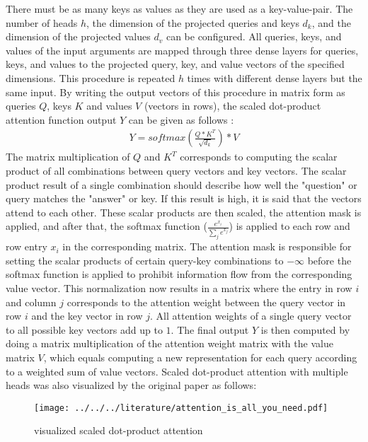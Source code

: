 \documentclass[draft,final]{vutinfth} %
\begin{document}
    There must be as many keys as values as they are used as a key-value-pair.
    The number of heads $h$, the dimension of the projected queries and keys $d_k$, and the dimension of the projected values $d_v$ can be configured.
    All queries, keys, and values of the input arguments are mapped through three dense layers for queries, keys, and values to the projected query, key, and value vectors of the specified dimensions.
    This procedure is repeated $h$ times with different dense layers but the same input. 
    By writing the output vectors of this procedure in matrix form as queries $Q$, keys $K$ and values $V$ (vectors in rows), the scaled dot-product attention function output $Y$ can be given as follows \cite[p. 4]{Transformer}:
    \begin{align}
    \label{sdpa}
    Y = softmax \left( \frac{Q * K^T}{\sqrt{d_k}} \right) * V
    \end{align}
    The matrix multiplication of $Q$ and $K^T$ corresponds to computing the scalar product of all combinations between query vectors and key vectors.
    The scalar product result of a single combination should describe how well the "question" or query matches the "answer" or key.
    If this result is high, it is said that the vectors attend to each other.
    These scalar products are then scaled, the attention mask is applied, and after that, the softmax function ($\frac{e^{x_i}}{\sum_j{e^{x_j}}}$) is applied to each row and row entry $x_i$ in the corresponding matrix.
    The attention mask is responsible for setting the scalar products of certain query-key combinations to $-\infty$ before the softmax function is applied to prohibit information flow from the corresponding value vector.
    This normalization now results in a matrix where the entry in row $i$ and column $j$ corresponds to the attention weight between the query vector in row $i$ and the key vector in row $j$. 
    All attention weights of a single query vector to all possible key vectors add up to $1$.
    The final output $Y$ is then computed by doing a matrix multiplication of the attention weight matrix with the value matrix $V$, which equals computing a new representation for each query according to a weighted sum of value vectors.
    Scaled dot-product attention with multiple heads was also visualized by the original paper as follows:
    \begin{figure}[H]
        \centering{}
        \texttt{[image: ../../../literature/attention\_is\_all\_you\_need.pdf]}
        \caption{visualized scaled dot-product attention \cite[p. 4]{Transformer}}
        \label{fig:sdpa_vis}
    \end{figure}
\end{document}
